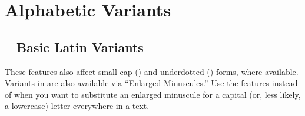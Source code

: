 \section{Alphabetic Variants}
\subsection{ – Basic Latin Variants}
These features also affect small cap () and underdotted
() forms,
where available. Variants in  are also available via  “Enlarged Minuscules.”
Use the  features instead of  when you want to substitute an
enlarged minuscule for a capital (or, less likely, a lowercase) letter everywhere in a text.

